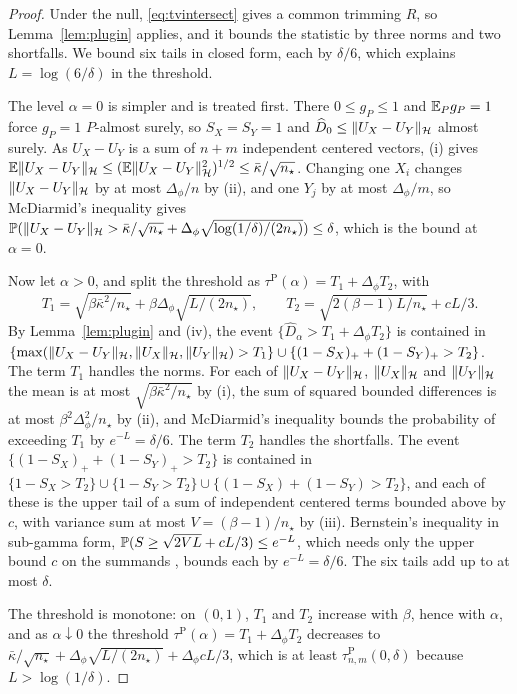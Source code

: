 \begin{proof}
Under the null, \eqref{eq:tvintersect} gives a common trimming $R$, so Lemma~\ref{lem:plugin} applies, and it bounds
the statistic by three norms and two shortfalls. We bound six tails in closed form, each by $\delta/6$, which explains
$L=\log(6/\delta)$ in the threshold.

The level $\alpha=0$ is simpler and is treated first. There $0\le g_P\le1$ and $\mathbb{E}_Pg_P=1$ force $g_P=1$
$P$-almost surely, so $S_X=S_Y=1$ and $\widehat D_0\le\|U_X-U_Y\|_{\mathcal{H}}$ almost surely. As $U_X-U_Y$ is a sum of $n+m$
independent centered vectors, (i) gives $\mathbb{E}\|U_X-U_Y\|_{\mathcal{H}}\le(\mathbb{E}\|U_X-U_Y\|_{\mathcal{H}}^2)^{1/2}\le\bar\kappa/\sqrt{n_\star}$.
Changing one $X_i$ changes $\|U_X-U_Y\|_{\mathcal{H}}$ by at most $\Delta_\phi/n$ by (ii), and one $Y_j$ by at most
$\Delta_\phi/m$, so McDiarmid's inequality gives
$\mathbb{P}(\|U_X-U_Y\|_{\mathcal{H}}>\bar\kappa/\sqrt{n_\star}+\Delta_\phi\sqrt{\log(1/\delta)/(2n_\star)})\le\delta$, which is the bound
at $\alpha=0$.

Now let $\alpha>0$, and split the threshold as $\tau^{\mathrm P}(\alpha)=T_1+\Delta_\phi T_2$, with
\[
T_1=\sqrt{\beta\bar\kappa^2/n_\star}+\beta\Delta_\phi\sqrt{L/(2n_\star)},
\qquad
T_2=\sqrt{2(\beta-1)L/n_\star}+cL/3 .
\]
By Lemma~\ref{lem:plugin} and (iv), the event $\{\widehat D_\alpha>T_1+\Delta_\phi T_2\}$ is contained in
$\{\max(\|U_X-U_Y\|_{\mathcal{H}},\|U_X\|_{\mathcal{H}},\|U_Y\|_{\mathcal{H}})>T_1\}\cup\{(1-S_X)_++(1-S_Y)_+>T_2\}$. The term $T_1$ handles the norms. For each of $\|U_X-U_Y\|_{\mathcal{H}}$, $\|U_X\|_{\mathcal{H}}$ and $\|U_Y\|_{\mathcal{H}}$ the mean is at most
$\sqrt{\beta\bar\kappa^2/n_\star}$ by (i), the sum of squared bounded differences is at most $\beta^2\Delta_\phi^2/n_\star$ by
(ii), and McDiarmid's inequality bounds the probability of exceeding $T_1$ by $e^{-L}=\delta/6$. The term $T_2$ handles
the shortfalls. The event $\{(1-S_X)_++(1-S_Y)_+>T_2\}$ is contained in
$\{1-S_X>T_2\}\cup\{1-S_Y>T_2\}\cup\{(1-S_X)+(1-S_Y)>T_2\}$, and each of these is the upper tail of a sum of
independent centered terms bounded above by $c$, with variance sum at most $V=(\beta-1)/n_\star$ by (iii). Bernstein's
inequality in sub-gamma form, $\mathbb{P}(S\ge\sqrt{2VL}+cL/3)\le e^{-L}$, which needs only the upper bound $c$ on the summands
\citep[Section~2.4 and Theorem~2.10]{boucheron2013concentration}, bounds each by $e^{-L}=\delta/6$. The six tails add up
to at most $\delta$.

The threshold is monotone: on $(0,1)$, $T_1$ and $T_2$ increase with $\beta$, hence with
$\alpha$, and as $\alpha\downarrow0$ the threshold $\tau^{\mathrm P}(\alpha)=T_1+\Delta_\phi T_2$ decreases to
$\bar\kappa/\sqrt{n_\star}+\Delta_\phi\sqrt{L/(2n_\star)}+\Delta_\phi cL/3$, which is at least
$\tau^{\mathrm P}_{n,m}(0,\delta)$ because $L>\log(1/\delta)$.
\end{proof}


